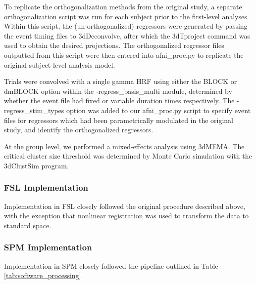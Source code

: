 To replicate the orthogonalization methods from the original study, a separate orthogonalization script was run for each subject prior to the first-level analyses. Within this script, the (un-orthogonalized) regressors were generated by passing the event timing files to 3dDeconvolve, after which the 3dTproject command was used to obtain the desired projections. The orthogonalized regressor files outputted from this script were then entered into afni\_proc.py to replicate the original subject-level analysis model. 

Trials were convolved with a single gamma HRF using either the BLOCK or dmBLOCK option within the -regress\_basis\_multi module, determined by whether the event file had fixed or variable duration times respectively. The -regress\_stim\_types option was added to our afni\_proc.py script to specify event files for regressors which had been parametrically modulated in the original study, and identify the orthogonalized regressors. 

At the group level, we performed a mixed-effects analysis using 3dMEMA. The critical cluster size threshold was determined by Monte Carlo simulation with the 3dClustSim program. 

\subsubsection{FSL Implementation}
Implementation in FSL closely followed the original procedure described above, with the exception that nonlinear registration was used to transform the data to standard space. 

\subsubsection{SPM Implementation}
Implementation in SPM closely followed the pipeline outlined in Table \ref{tab:software_processing}.


